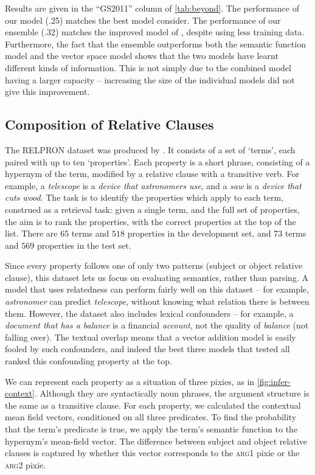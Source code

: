 \documentclass[a4paper,11pt]{article}
\begin{document}
Results are given in the ``GS2011'' column of \cref{tab:beyond}.
The performance of our model (.25) matches the best model \citeauthor{grefenstette2011svo} consider.
The performance of our ensemble (.32) matches the improved model of \citet{grefenstette2013regression},
despite using less training data.
Furthermore, the fact that the ensemble
outperforms both the semantic function model and the vector space model
shows that the two models have learnt different kinds of information.
This is not simply due to the combined model having a larger capacity --
increasing the size of the individual models did not give this improvement.


\subsection{Composition of Relative Clauses}
\label{sec:relpron}

The RELPRON dataset was produced by \citet{rimell2016relpron}.
It consists of a set of `terms', each paired with up to ten `properties'.
Each property is a short phrase,
consisting of a hypernym of the term,
modified by a relative clause with a transitive verb.
For example,
a \textit{telescope} is a \textit{device that astronomers use},
and a \textit{saw} is a \textit{device that cuts wood}.
The task is to identify the properties which apply to each term,
construed as a retrieval task:
given a single term, and the full set of properties,
the aim is to rank the properties,
with the correct properties at the top of the list.
There are $65$ terms and $518$ properties in the development set,
and $73$ terms and $569$ properties in the test set.

Since every property follows one of only two patterns
(subject or object relative clause),
this dataset lets us focus on evaluating semantics, rather than parsing.
A model that uses relatedness can perform fairly well on this dataset --
for example, \textit{astronomer} can predict \textit{telescope},
without knowing what relation there is between them.
However, the dataset also includes lexical confounders --
for example, a \textit{document that has a balance} is a financial \textit{account},
not the quality of \textit{balance} (not falling over).
The textual overlap means that
a vector addition model is easily fooled by such confounders,
and indeed the best three models that \citeauthor{rimell2016relpron} tested
all ranked this confounding property at the top.

We can represent each property as a situation of three pixies, as in \cref{fig:infer-context}.
Although they are syntactically noun phrases, the argument structure is the same as a transitive clause.
For each property, we calculated the contextual mean field vectors,
conditioned on all three predicates.
To find the probability that the term's predicate is true,
we apply the term's semantic function to the hypernym's mean-field vector.
The difference between subject and object relative clauses
is captured by whether this vector corresponds to
the \textsc{arg1} pixie or the \textsc{arg2} pixie.
\end{document}
